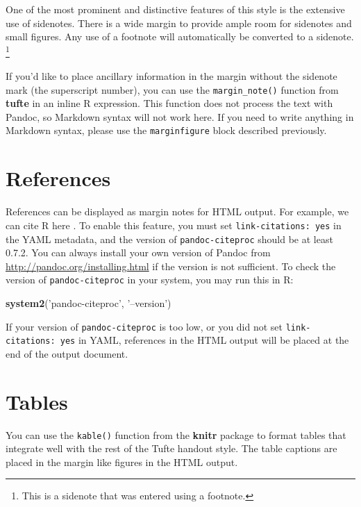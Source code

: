 \documentclass[]{tufte-handout}
\newenvironment{Shaded}{}{}
\newcommand{\KeywordTok}[1]{\textcolor[rgb]{0.00,0.44,0.13}{\textbf{#1}}}
\newcommand{\NormalTok}[1]{#1}
\newcommand{\StringTok}[1]{\textcolor[rgb]{0.25,0.44,0.63}{#1}}
\begin{document}
One of the most prominent and distinctive features of this style is the
extensive use of sidenotes. There is a wide margin to provide ample room
for sidenotes and small figures. Any use of a footnote will
automatically be converted to a sidenote. \footnote{This is a sidenote
  that was entered using a footnote.}

If you'd like to place ancillary information in the margin without the
sidenote mark (the superscript number), you can use the
\texttt{margin\_note()} function from \textbf{tufte} in an inline R
expression.
This function does not process the text with Pandoc, so Markdown syntax
will not work here. If you need to write anything in Markdown syntax,
please use the \texttt{marginfigure} block described previously.

\hypertarget{references}{%
\section{References}\label{references}}

References can be displayed as margin notes for HTML output. For
example, we can cite R here \citep{R-base}. To enable this feature, you
must set \texttt{link-citations:\ yes} in the YAML metadata, and the
version of \texttt{pandoc-citeproc} should be at least 0.7.2. You can
always install your own version of Pandoc from
\url{http://pandoc.org/installing.html} if the version is not
sufficient. To check the version of \texttt{pandoc-citeproc} in your
system, you may run this in R:

\begin{Shaded}
\begin{Highlighting}[]
\KeywordTok{system2}\NormalTok{(}\StringTok{'pandoc-citeproc'}\NormalTok{, }\StringTok{'--version'}\NormalTok{)}
\end{Highlighting}
\end{Shaded}

If your version of \texttt{pandoc-citeproc} is too low, or you did not
set \texttt{link-citations:\ yes} in YAML, references in the HTML output
will be placed at the end of the output document.

\hypertarget{tables}{%
\section{Tables}\label{tables}}

You can use the \texttt{kable()} function from the \textbf{knitr}
package to format tables that integrate well with the rest of the Tufte
handout style. The table captions are placed in the margin like figures
in the HTML output.
\end{document}
